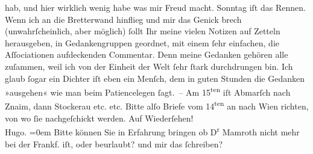\begin{ledgroupsized}[t]{13cm}
                    hab, und hier wirklich wenig habe was mir Freud macht. Sonntag iſt das Rennen.
                    Wenn ich an die Bretterwand hinflieg und mir das Genick brech (unwahrſcheinlich,
                        {\pb}aber möglich) ſollt Ihr
                    meine vielen Notizen auf Zetteln herausgeben, in Gedankengruppen geordnet, mit
                    einem ſehr einfachen, die Aſſociationen aufdeckenden Commentar. Denn meine
                    Gedanken gehören alle zuſammen, weil ich von der Einheit der Welt ſehr ſtark
                    durchdrungen bin. Ich glaub ſogar ein Dichter iſt eben ein Menſch, dem in guten
                    Stunden die Gedanken »ausgehen« wie man beim Patiencelegen ſagt. – Am
                            15\textsuperscript{ten} iſt Abmarſch {\pb}nach
                        Znaim, dann Stockerau etc. etc. Bitte alſo Briefe vom 14\textsuperscript{ten} an nach Wien richten, von wo ſie
                    nachgeſchickt werden.\pend
           \pstart
           Auf Wiederſehen!{\\[\baselineskip]}\spacefill\mbox{Hugo.}\pend
           \leftskip=0em{}\pstart
           \noindent{}Bitte können Sie in Erfahrung bringen ob D\textsuperscript{r}{ }Mamroth nicht mehr bei der Frankf. iſt, oder beurlaubt? und mir das
                        ſchreiben? \pend
           \endnumbering{}\end{ledgroupsized}  \newcommand{\dateiname}{L00471}\newcommand{\titel}{Hugo von Hofmannsthal an Arthur Schnitzler, 9. 8. [1895]}\newcommand{\editorInnen}{Martin Anton Müller und Gerd-Hermann Susen}
      